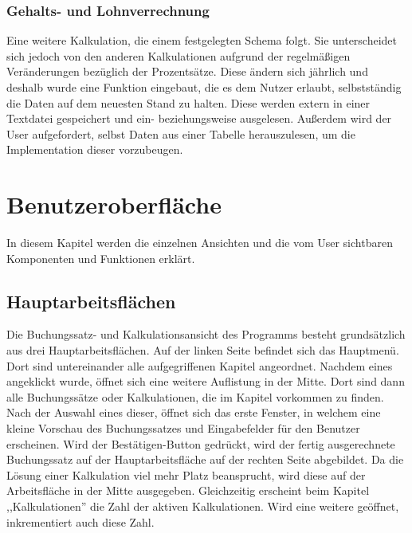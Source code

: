 \documentclass[12pt]{report}
\begin{document}
\subsection{Gehalts- und Lohnverrechnung}
Eine weitere Kalkulation, die einem festgelegten Schema folgt. Sie unterscheidet sich jedoch von den anderen Kalkulationen aufgrund der regelmäßigen Veränderungen bezüglich der Prozentsätze. Diese ändern sich jährlich und deshalb wurde eine Funktion eingebaut, die es dem Nutzer erlaubt, selbstständig die Daten auf dem neuesten Stand zu halten. Diese werden extern in einer Textdatei gespeichert und ein- beziehungsweise ausgelesen. Außerdem wird der User aufgefordert, selbst Daten aus einer Tabelle herauszulesen, um die Implementation dieser vorzubeugen.





\chapter{Benutzeroberfläche}
\lhead{\thepage}
 
In diesem Kapitel werden die einzelnen Ansichten und die vom User sichtbaren Komponenten und Funktionen erklärt.
 
\section{Hauptarbeitsflächen}
Die Buchungssatz- und Kalkulationsansicht des Programms besteht grundsätzlich aus drei Hauptarbeitsflächen. Auf der linken Seite befindet sich das Hauptmenü. Dort sind untereinander alle aufgegriffenen Kapitel angeordnet. Nachdem eines angeklickt wurde, öffnet sich eine weitere Auflistung in der Mitte. Dort sind dann alle Buchungssätze oder Kalkulationen, die im Kapitel vorkommen zu finden. Nach der Auswahl eines dieser, öffnet sich das erste Fenster, in welchem eine kleine Vorschau des Buchungssatzes und Eingabefelder für den Benutzer erscheinen. Wird der Bestätigen-Button gedrückt, wird der fertig ausgerechnete Buchungssatz auf der Hauptarbeitsfläche auf der rechten Seite abgebildet. Da die Lösung einer Kalkulation viel mehr Platz beansprucht, wird diese auf der Arbeitsfläche in der Mitte ausgegeben. Gleichzeitig erscheint beim Kapitel ,,Kalkulationen'' die Zahl der aktiven Kalkulationen. Wird eine weitere geöffnet, inkrementiert auch diese Zahl.
\end{document}
